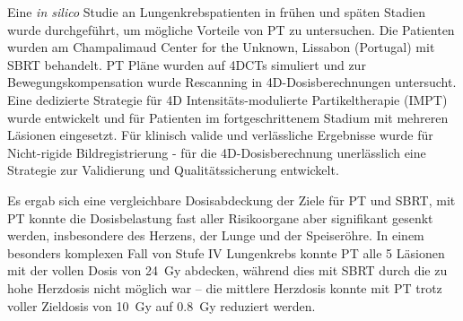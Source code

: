 Eine \textit{in silico} Studie an Lungenkrebspatienten in fr\"{u}hen und sp\"{a}ten Stadien wurde durchgef\"{u}hrt, 
um m\"{o}gliche Vorteile von PT zu untersuchen. Die Patienten wurden am Champalimaud Center for the 
Unknown, Lissabon (Portugal) mit SBRT behandelt. PT Pl\"{a}ne wurden auf 4DCTs simuliert und zur 
Bewegungskompensation wurde Rescanning in 4D-Dosisberechnungen untersucht. Eine dedizierte Strategie 
f\"{u}r 4D Intensit\"{a}ts-modulierte Partikeltherapie (IMPT) wurde entwickelt und f\"{u}r Patienten im fortgeschrittenem 
Stadium mit mehreren L\"{a}sionen eingesetzt. F\"{u}r klinisch valide und verl\"{a}ssliche Ergebnisse wurde f\"{u}r Nicht-rigide
Bildregistrierung - f\"{u}r die 4D-Dosisberechnung unerl\"{a}sslich eine Strategie zur Validierung und Qualit\"{a}tssicherung entwickelt.

Es ergab sich eine vergleichbare Dosisabdeckung der Ziele f\"{u}r PT und SBRT, mit PT konnte die 
Dosisbelastung fast aller Risikoorgane aber signifikant gesenkt werden, insbesondere des Herzens, der Lunge und der Speiser\"{o}hre. 
In einem besonders komplexen Fall von Stufe IV Lungenkrebs konnte PT alle 5 L\"{a}sionen mit der vollen Dosis von 24~Gy abdecken, w\"{a}hrend dies mit SBRT durch die zu hohe 
Herzdosis nicht m\"{o}glich war – die mittlere Herzdosis konnte mit PT trotz voller Zieldosis von 10~Gy auf 0.8~Gy reduziert werden.


